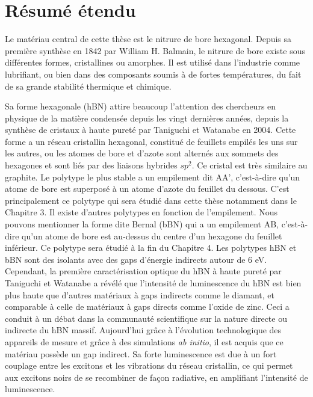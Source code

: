 \chapter*{Résumé étendu}


Le matériau central de cette thèse est le nitrure de bore hexagonal. Depuis sa première synthèse en 1842 par William H. Balmain, le nitrure de bore existe sous différentes formes, cristallines ou amorphes. Il est utilisé dans l'industrie comme lubrifiant, ou bien dans des composants soumis à de fortes températures, du fait de sa grande stabilité thermique et chimique.

Sa forme hexagonale (hBN) attire beaucoup l'attention des chercheurs en physique de la matière condensée depuis les vingt dernières années, depuis la synthèse de cristaux à haute pureté par Taniguchi et Watanabe en 2004. Cette forme a un réseau cristallin hexagonal, constitué de feuillets empilés les uns sur les autres, ou les atomes de bore et d'azote sont alternés aux sommets des hexagones et sont liés par des liaisons hybrides $sp^2$. Ce cristal est très similaire au graphite.
Le polytype le plus stable a un empilement dit AA', c'est-à-dire qu'un atome de bore est superposé à un atome d'azote du feuillet du dessous. C'est principalement ce polytype qui sera étudié dans cette thèse notamment dans le Chapitre 3. Il existe d'autres polytypes en fonction de l'empilement. Nous pouvons mentionner la forme dite Bernal (bBN) qui a un empilement AB, c'est-à-dire qu'un atome de bore est au-dessus du centre d'un hexagone du feuillet inférieur. Ce polytype sera étudié à la fin du Chapitre 4.
Les polytypes hBN et bBN sont des isolants avec des gaps d'énergie indirects autour de 6 eV. Cependant, la première caractérisation optique du hBN à haute pureté par Taniguchi et Watanabe a révélé que l'intensité de luminescence du hBN est bien plus haute que d'autres matériaux à gaps indirects comme le diamant, et comparable à celle de matériaux à gaps directs comme l'oxide de zinc. Ceci a conduit à un débat dans la communauté scientifique sur la nature directe ou indirecte du hBN massif. Aujourd'hui grâce à l'évolution technologique des appareils de mesure et grâce à des simulations \textit{ab initio}, il est acquis que ce matériau possède un gap indirect. Sa forte luminescence est due à un fort couplage entre les excitons et les vibrations du réseau cristallin, ce qui permet aux excitons noirs de se recombiner de façon radiative, en amplifiant l'intensité de luminescence. 

